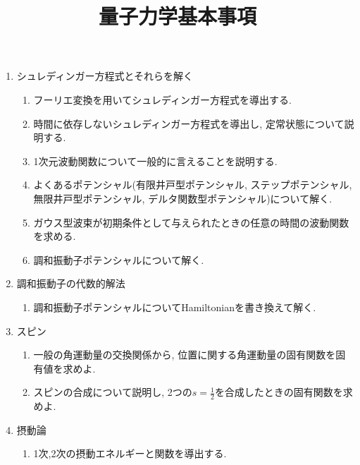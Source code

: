\documentclass[11pt,a4paper]{jarticle}
\title{量子力学基本事項}
\author{}
\date{}
\begin{document}
\maketitle
\begin{enumerate}
    \item シュレディンガー方程式とそれらを解く
    \begin{enumerate}
        \item フーリエ変換を用いてシュレディンガー方程式を導出する.
        \item 時間に依存しないシュレディンガー方程式を導出し, 定常状態について説明する.
        \item 1次元波動関数について一般的に言えることを説明する.
        \item よくあるポテンシャル(有限井戸型ポテンシャル, ステップポテンシャル, 無限井戸型ポテンシャル, デルタ関数型ポテンシャル)について解く.
        \item ガウス型波束が初期条件として与えられたときの任意の時間の波動関数を求める.
        \item 調和振動子ポテンシャルについて解く.
    \end{enumerate}
    \item 調和振動子の代数的解法
    \begin{enumerate}
        \item 調和振動子ポテンシャルについてHamiltonianを書き換えて解く.
    \end{enumerate}
    \item スピン
    \begin{enumerate}
        \item 一般の角運動量の交換関係から, 位置に関する角運動量の固有関数を固有値を求めよ.
        \item スピンの合成について説明し, 2つの$s=\frac{1}{2}$を合成したときの固有関数を求めよ.
    \end{enumerate}
    \item 摂動論
    \begin{enumerate}
        \item 1次,2次の摂動エネルギーと関数を導出する.
    \end{enumerate}
\end{enumerate}
\end{document}
